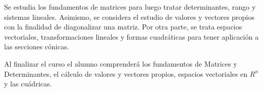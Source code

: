 \begin{syllabus}


\begin{justification}
Se estudia los fundamentos de matrices para luego tratar determinantes, rango y sistemas lineales. Asimismo, se considera el estudio de valores y vectores propios con la finalidad de diagonalizar una matriz. Por otra parte, se trata espacios vectoriales, transformaciones lineales y formas cuadráticas para tener aplicación a las secciones cónicas.
\end{justification}

\begin{goals}
\item Al finalizar el curso el alumno comprenderá los fundamentos de Matrices y Determinantes, el cálculo de valores y vectores propios, espacios vectoriales en $R^n$ y las cuádricas.
\end{goals}

\begin{outcomes}
\end{outcomes}


\end{syllabus}
